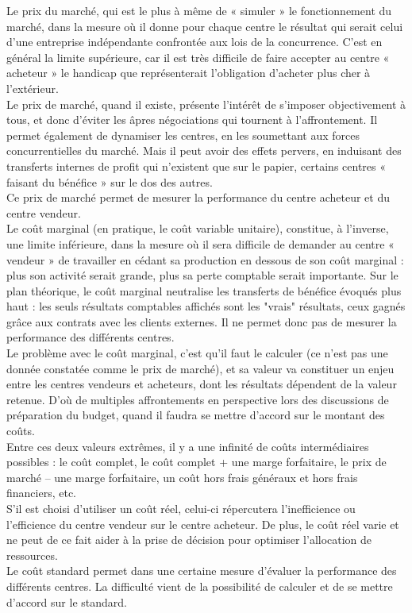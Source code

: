 \documentclass{tufte-handout}
\begin{document}
Le prix du marché, qui est le plus à même de « simuler » le fonctionnement du marché, dans la mesure où il donne pour chaque centre le résultat qui serait celui d’une entreprise indépendante confrontée aux lois de la concurrence. C’est en général la limite supérieure, car il est très difficile de faire accepter au centre « acheteur » le handicap que représenterait l’obligation d’acheter plus cher à l’extérieur.\\
Le prix de marché, quand il existe, présente l’intérêt de s’imposer objectivement à tous, et donc d’éviter les âpres négociations qui tournent à l’affrontement. Il permet également de dynamiser les centres, en les soumettant aux forces concurrentielles du marché. Mais il peut avoir des effets pervers, en induisant des transferts internes de profit qui n’existent que sur le papier, certains centres « faisant du bénéfice » sur le dos des autres.\\
Ce prix de marché permet de mesurer la performance du centre acheteur et du centre vendeur.\\

Le coût marginal (en pratique, le coût variable unitaire), constitue, à l’inverse, une limite inférieure, dans la mesure où il sera difficile de demander au centre « vendeur » de travailler en cédant sa production en dessous de son coût marginal : plus son activité serait grande, plus sa perte comptable serait importante. Sur le plan théorique, le coût marginal neutralise les transferts de bénéfice évoqués plus haut : les seuls résultats comptables affichés sont les "vrais" résultats, ceux gagnés grâce aux contrats avec les clients externes. Il ne permet donc pas de mesurer la performance des différents centres.\\
Le problème avec le coût marginal, c’est qu’il faut le calculer (ce n’est pas une donnée constatée comme le prix de marché), et sa valeur va constituer un enjeu entre les centres vendeurs et acheteurs, dont les résultats dépendent de la valeur retenue. D’où de multiples affrontements en perspective lors des discussions de préparation du budget, quand il faudra se mettre d’accord sur le montant des coûts.\\

Entre ces deux valeurs extrêmes, il y a une infinité de coûts intermédiaires possibles : le coût complet, le coût complet + une marge forfaitaire, le prix de marché – une marge forfaitaire, un coût hors frais généraux et hors frais financiers, etc.\\
S’il est choisi d’utiliser un coût réel, celui-ci répercutera l’inefficience ou l’efficience du centre vendeur sur le centre acheteur. De plus, le coût réel varie et ne peut de ce fait aider à la prise de décision pour optimiser l’allocation de ressources.\\
Le coût standard permet dans une certaine mesure d’évaluer la performance des différents centres. La difficulté vient de la possibilité de calculer et de se mettre d’accord sur le standard.\\
\end{document}
